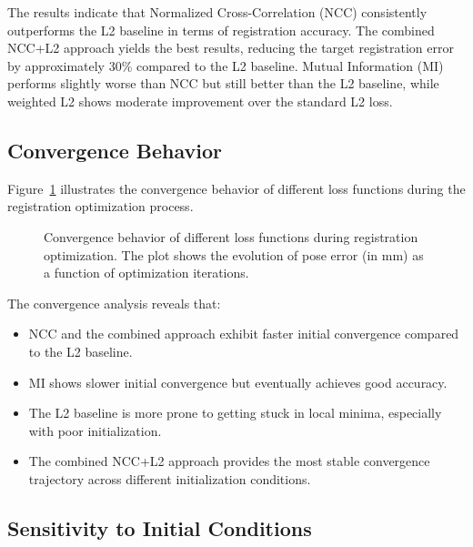 The results indicate that Normalized Cross-Correlation (NCC) consistently outperforms the L2 baseline in terms of registration accuracy. The combined NCC+L2 approach yields the best results, reducing the target registration error by approximately 30\% compared to the L2 baseline. Mutual Information (MI) performs slightly worse than NCC but still better than the L2 baseline, while weighted L2 shows moderate improvement over the standard L2 loss.

\subsection{Convergence Behavior}

Figure~\ref{fig:loss_convergence} illustrates the convergence behavior of different loss functions during the registration optimization process.

\begin{figure}[htpb]
  \centering
  \caption[Convergence behavior of different loss functions]{Convergence behavior of different loss functions during registration optimization. The plot shows the evolution of pose error (in mm) as a function of optimization iterations.}
  \label{fig:loss_convergence}
\end{figure}

The convergence analysis reveals that:

\begin{itemize}
    \item NCC and the combined approach exhibit faster initial convergence compared to the L2 baseline.
    
    \item MI shows slower initial convergence but eventually achieves good accuracy.
    
    \item The L2 baseline is more prone to getting stuck in local minima, especially with poor initialization.
    
    \item The combined NCC+L2 approach provides the most stable convergence trajectory across different initialization conditions.
\end{itemize}

\subsection{Sensitivity to Initial Conditions}

